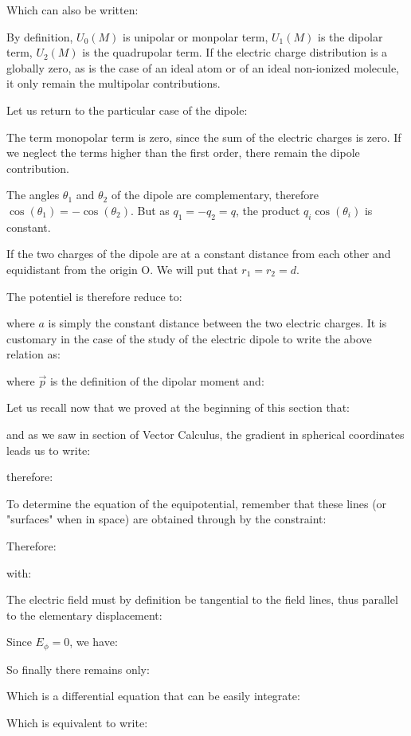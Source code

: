 	Which can also be written:
	
	By definition, $U_0(M)$ is unipolar or monpolar term, $U_1(M)$ is the dipolar term, $U_2(M)$ is the quadrupolar term. If the electric charge distribution is a globally zero, as is the case of an ideal atom or of an ideal non-ionized molecule, it only remain the multipolar contributions.
	
	Let us return to the particular case of the dipole:
	
	The term monopolar term is zero, since the sum of the electric charges is zero. If we neglect the terms higher than the first order, there remain the dipole contribution.
	
	The angles $\theta_1$ and $\theta_2$ of the dipole are complementary, therefore $\cos(\theta_1)=-\cos(\theta_2)$. But as $q_1=-q_2=q$, the product $q_i\cos(\theta_i)$ is constant.
	
	If the two charges of the dipole are at a constant distance from each other and equidistant from the origin O. We will put that $r_1=r_2=d$.

	The potentiel is therefore reduce to:
	
	
	where $a$ is simply the constant distance between the two electric charges.
	It is customary in the case of the study of the electric dipole to write the above relation as:
	
	where $\vec{p}$ is the definition of the dipolar moment and:
	
	Let us recall now that we proved at the beginning of this section that:
	
	and as we saw in section of Vector Calculus, the gradient in spherical coordinates leads us to write:
	
	therefore:
	
	To determine the equation of the equipotential, remember that these lines (or "surfaces" when in space) are obtained through by the constraint:
	
	Therefore:
	
	with:
	
	The electric field must by definition be tangential to the field lines, thus parallel to the elementary displacement:
	
	Since $E_\phi=0$, we have:
	
	So finally there remains only:
	
	Which is a differential equation that can be easily integrate:
	
	Which is equivalent to write:
	
